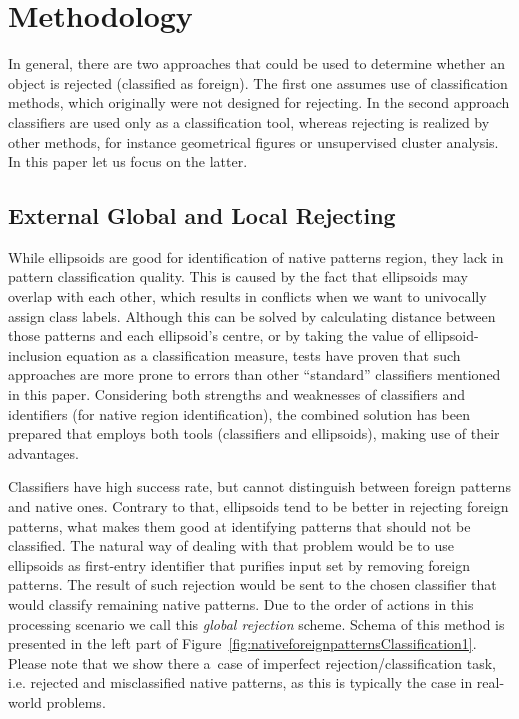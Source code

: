 \documentclass{llncs}
\begin{document}
\vspace{-6pt}
\section{Methodology}
  \label{sec:Methodology}
  
In general, there are two approaches that could be used to determine whether an object is rejected (classified as foreign). The first one assumes  use of classification methods, which originally were not designed for rejecting. In the second approach classifiers are used only as a classification tool, whereas rejecting is realized by other methods, for instance geometrical figures or unsupervised cluster analysis. In this paper let us focus on the latter.

\vspace{-6pt}
\subsection{External Global and Local Rejecting}
  \label{subsec:GlobalLocalRejecting}
\vspace{-3pt}

While ellipsoids are good for identification of native patterns region, they lack in pattern classification quality. This is caused by the fact that ellipsoids may overlap with each other, which results in conflicts when we want to univocally assign class labels. Although this can be solved by calculating distance between those patterns and each ellipsoid's centre, or by taking the value of ellipsoid-inclusion equation as a classification measure, tests have proven that such approaches are more prone to errors than other ``standard'' classifiers mentioned in this paper. Considering both strengths and weaknesses of classifiers and identifiers (for native region identification), the combined solution has been prepared that employs both tools (classifiers and ellipsoids), making use of their advantages.

Classifiers have high success rate, but cannot distinguish between foreign patterns and native ones. Contrary to that, ellipsoids tend to be better in rejecting foreign patterns, what makes them good at identifying patterns that should not be classified. The natural way of dealing with that problem would be to use ellipsoids as first-entry identifier that purifies input set by removing foreign patterns. The result of such rejection would be sent to the chosen classifier that would classify remaining native patterns. Due to the order of actions in this processing scenario we call this \textit{global rejection} scheme. Schema of this method is presented in the left part of Figure~\ref{fig:nativeforeignpatternsClassification1}. Please note that we show there a~case of imperfect rejection/classification task, i.e. rejected and misclassified native patterns, as this is typically the case in real-world problems.
\end{document}
